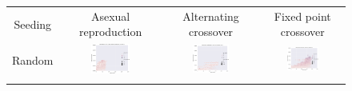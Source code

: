 \documentclass{article}
\begin{document}
\begin{landscape}
\begin{figure}[t]
\begin{center}
\begin{tabular}{c c c c}
    Seeding & Asexual reproduction & Alternating crossover & Fixed point crossover \\
    Random & \includegraphics[align=c,width=0.42\textwidth]{gd/e3/1} & \includegraphics[align=c,width=0.42\textwidth]{gd/e3/2} & \includegraphics[align=c,width=0.42\textwidth]{gd/e3/3} \\
    & & & \\

\end{tabular}
\end{center}
\end{figure}
\end{landscape}
\end{document}
